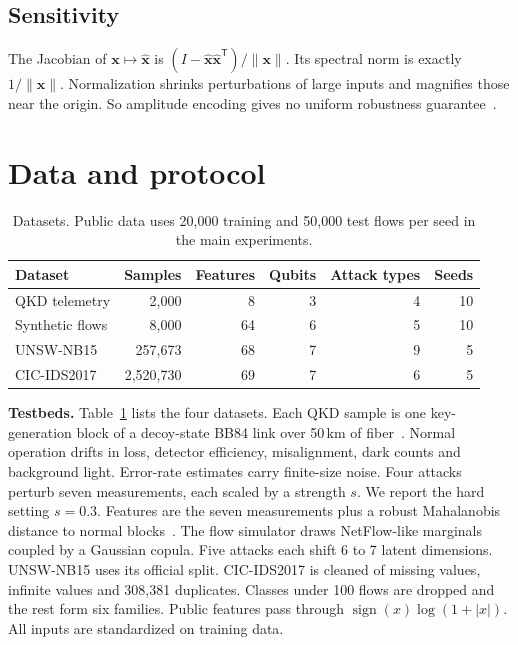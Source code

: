 \documentclass[pdflatex,sn-mathphys-num,lineno]{sn-jnl}
\theoremstyle{thmstyleone}
\begin{document}
\subsection{Sensitivity}

The Jacobian of $\mathbf{x}\mapsto\hat{\mathbf{x}}$ is
$(I-\hat{\mathbf{x}}\hat{\mathbf{x}}^{\mathsf{T}})/\|\mathbf{x}\|$. Its spectral norm
is exactly $1/\|\mathbf{x}\|$. Normalization shrinks perturbations of large inputs
and magnifies those near the origin. So amplitude encoding gives no uniform
robustness guarantee~\cite{larose2020robust}.

\section{Data and protocol}
\label{sec:protocol}

\begin{table}[t]
  \centering
  \caption{Datasets. Public data uses 20,000 training and 50,000 test flows per
  seed in the main experiments.}
  \label{tab:data}
  \small
  \begin{tabular}{lrrrrr}
    \toprule
    Dataset & Samples & Features & Qubits & Attack types & Seeds \\
    \midrule
    QKD telemetry & 2,000 & 8 & 3 & 4 & 10 \\
    Synthetic flows & 8,000 & 64 & 6 & 5 & 10 \\
    UNSW-NB15 & 257,673 & 68 & 7 & 9 & 5 \\
    CIC-IDS2017 & 2,520,730 & 69 & 7 & 6 & 5 \\
    \bottomrule
  \end{tabular}
\end{table}

\textbf{Testbeds.} Table~\ref{tab:data} lists the four datasets. Each QKD sample is
one key-generation block of a decoy-state BB84 link over 50\,km of
fiber~\cite{lo2005decoy}. Normal operation drifts in loss, detector efficiency,
misalignment, dark counts and background light. Error-rate estimates carry
finite-size noise. Four attacks perturb seven measurements, each scaled by a
strength $s$. We report the hard setting $s=0.3$. Features are the seven
measurements plus a robust Mahalanobis distance to normal
blocks~\cite{rousseeuw1999fast}. The flow simulator draws NetFlow-like marginals
coupled by a Gaussian copula. Five attacks each shift 6 to 7 latent dimensions.
UNSW-NB15 uses its official split. CIC-IDS2017 is cleaned of missing values,
infinite values and 308,381 duplicates. Classes under 100 flows are dropped and
the rest form six families. Public features pass through
$\operatorname{sign}(x)\log(1+|x|)$. All inputs are standardized on training data.
\end{document}
